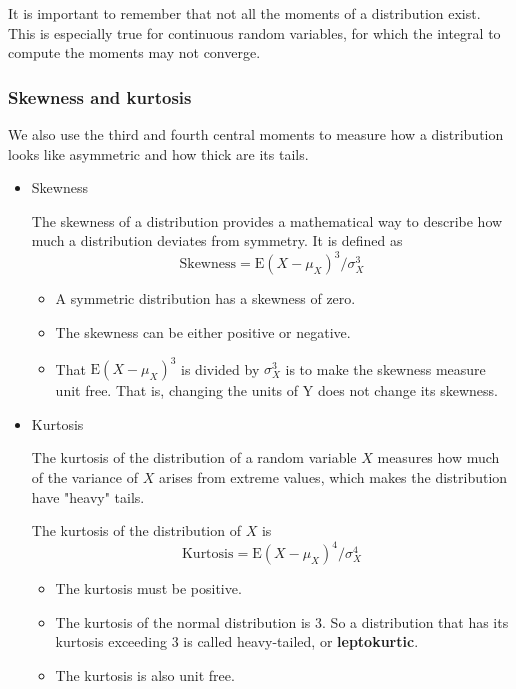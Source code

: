 \documentclass[a4paper,11pt]{article}
\begin{document}
It is important to remember that not all the moments of a distribution
exist. This is especially true for continuous random variables, for
which the integral to compute the moments may not converge.

\subsubsection*{Skewness and kurtosis}
\label{sec:org9325a08}

We also use the third and fourth central moments to measure how a
distribution looks like asymmetric and how thick are its tails.

\begin{itemize}
\item Skewness
\label{sec:org32acea9}

The skewness of a distribution provides a mathematical way to describe
how much a distribution deviates from symmetry. It is defined as
\[ \text{Skewness} =  \mathrm{E}(X - \mu_X)^{3}/\sigma_{X}^{3} \]

\begin{itemize}
\item A symmetric distribution has a skewness of zero.
\item The skewness can be either positive or negative.
\item That \(\mathrm{E}(X - \mu_X)^3\) is divided by \(\sigma^3_X\) is to make the
skewness measure unit free. That is, changing the units of Y does
not change its skewness.
\end{itemize}

\item Kurtosis
\label{sec:org128ca8d}

The kurtosis of the distribution of a random variable \(X\) measures how
much of the variance of \(X\) arises from extreme values, which makes
the distribution have "heavy" tails.

The kurtosis of the distribution of \(X\) is
\[ \text{Kurtosis} = \mathrm{E}(X - \mu_X)^{4}/\sigma_{X}^{4} \]

\begin{itemize}
\item The kurtosis must be positive.
\item The kurtosis of the normal distribution is 3. So a distribution that
has its kurtosis exceeding 3 is called heavy-tailed, or
\textbf{leptokurtic}.
\item The kurtosis is also unit free.
\end{itemize}


\end{itemize}
\end{document}
